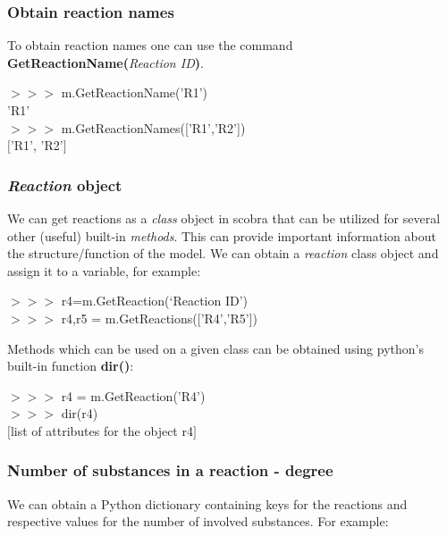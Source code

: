 
\subsubsection{Obtain reaction names}
To obtain reaction names one can use the command \textbf{GetReactionName(}\textit{Reaction ID}\textbf{)}.

\begin{framed}
$>>>$ m.GetReactionName('R1')\\
'R1'\\

$>>>$ m.GetReactionNames(['R1','R2'])\\
$[$'R1', 'R2'$]$
\end{framed}


\subsubsection{\textit{Reaction}  object}
We can get reactions as a \textit{class} object in scobra that can be utilized for several other (useful) built-in \textit{methods}. This can provide important information about the structure/function of the model. We can obtain a \textit{reaction} class object and assign it to a variable, for example:

\begin{framed}
$>>>$ r4=m.GetReaction(`Reaction ID')\\
$>>>$ r4,r5 = m.GetReactions(['R4','R5'])
\end{framed}

Methods which can be used on a given class can be obtained using python's built-in function \textbf{dir()}:
\begin{framed}
$>>>$ r4 = m.GetReaction('R4')\\
$>>>$ dir(r4)\\
$[$list of attributes for the object r4$]$
\end{framed}


\subsubsection{Number of substances in a reaction - degree}

We can obtain a Python dictionary containing keys for the reactions and respective values for the number of involved substances. For example:

